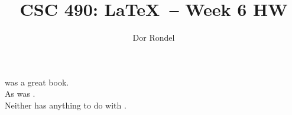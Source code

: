 \documentclass[11pt]{article}
\title{CSC 490: \LaTeX\ -- Week 6 HW}
\author{Dor Rondel}
\begin{document}
\cite{GATE} was a great book. \\
As was \cite{OMEN}. \\
Neither has anything to do with \cite{AI}. \\
\nocite{ANN}



\end{document}
